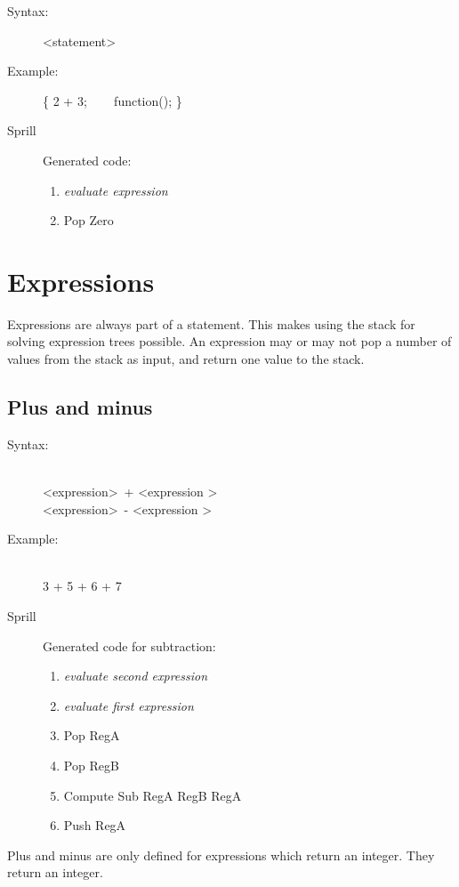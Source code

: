 \documentclass[10pt,a4paper]{report}
\begin{document}
\begin{description}
	\item[Syntax:] 
		\textless statement\textgreater
	\item[Example:] 
		\{ 2 + 3; ~~~ function(); \}
	\item[Sprill] Generated code:
		\begin{enumerate}
			\item \emph{evaluate expression}
			\item Pop Zero
		\end{enumerate}
\end{description} 

\section{Expressions}
Expressions are always part of a statement. This makes using the stack for solving expression trees possible. An expression may or may not pop a number of values from the stack as input, and return one value to the stack. 

\subsection{Plus and minus}
\begin{description}
	\item[Syntax:] \hfill \\ 
		\textless expression\textgreater ~+ \textless expression \textgreater \\
		\textless expression\textgreater ~- \textless expression \textgreater
	\item[Example:] \hfill \\
		3 + 5 + 6 + 7 
	\item[Sprill] Generated code for subtraction:
		\begin{enumerate}
			\item \emph{evaluate second expression}
			\item \emph{evaluate first expression}
			\item Pop RegA
			\item Pop RegB
			\item Compute Sub RegA RegB RegA
			\item Push RegA
		\end{enumerate}
\end{description} 
Plus and minus are only defined for expressions which return an integer. They return an integer.
\end{document}
